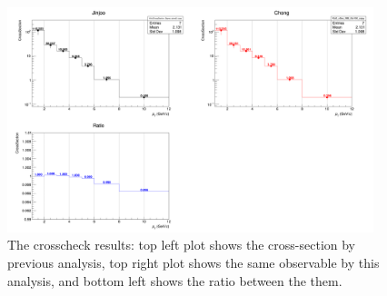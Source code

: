 \vspace{\columnsep}
\begin{figure}[h]
    \centering
    \includegraphics[width=0.95\textwidth]{plots/s2_xCheck.png}
    \caption{The crosscheck results: top left plot shows the \Xic cross-section by previous analysis, top right plot shows the same observable by this analysis, and bottom left shows the ratio between the them.}
    \label{fig:s2_xCheck}
\end{figure}
